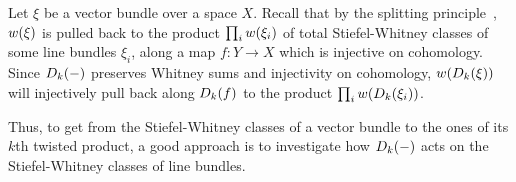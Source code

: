 \begin{Rem}
  Let $\xi$ be a vector bundle over a space $X$.
  Recall that by the splitting
  principle~\cite[Theorem~(19.3.9)]{tomdieck}, ${w}(\xi)$ is
  pulled back to the product $\prod_i{w}(\xi_i)$ of total
  Stiefel-Whitney classes of some line bundles $\xi_i$,
  along a map $f\colon Y\to X$ which is injective on cohomology.
  Since $D_{k}({-})$ preserves Whitney sums and injectivity on
  cohomology, ${w}(D_{k}({\xi}))$ will injectively pull
  back along $D_{k}({f})$ to the product
  $\prod_i{w}(D_{k}({\xi_i}))$.
\end{Rem}

Thus, to get from the Stiefel-Whitney classes of a vector bundle to
the ones of its $k$th twisted product, a good approach is to
investigate how $D_{k}({-})$ acts on the Stiefel-Whitney
classes of line bundles.
